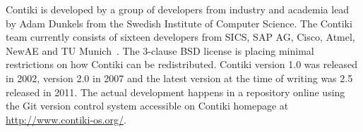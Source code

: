 Contiki is developed by a group of developers from industry and academia
lead by Adam Dunkels from the Swedish Institute of Computer Science.
The Contiki team currently consists of sixteen developers from SICS,
SAP AG, Cisco, Atmel, NewAE and TU Munich~\cite{contiki-docs}.
The 3-clause BSD license is placing minimal restrictions on how Contiki can be redistributed.
Contiki version 1.0 was released in 2002, version 2.0 in 2007 and the latest version
at the time of writing was 2.5 released in 2011.
The actual development happens in a repository online using the Git version control system
accessible on Contiki homepage at \url{http://www.contiki-os.org/}.









